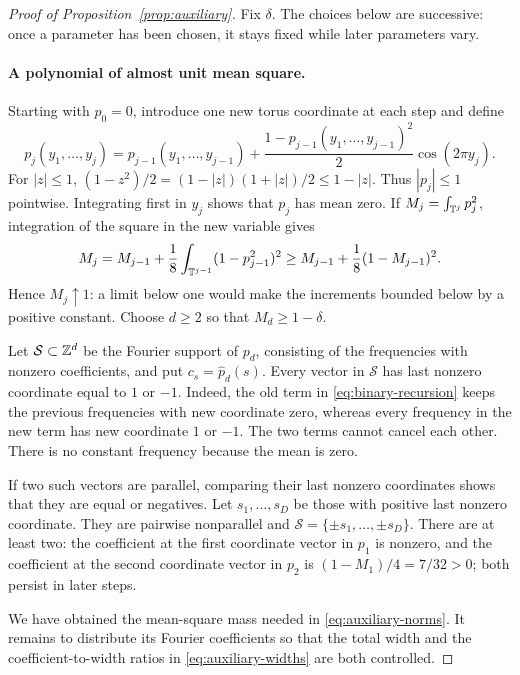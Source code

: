 \begin{proof}[Proof of Proposition~\ref{prop:auxiliary}]
Fix $\delta$.  The choices below are successive: once a parameter has
been chosen, it stays fixed while later parameters vary.

\paragraph{A polynomial of almost unit mean square.}
Starting with $p_0=0$, introduce one new torus coordinate at each step
and define
\begin{equation}
 \label{eq:binary-recursion}
 p_j(y_1,\ldots,y_j)
 =p_{j-1}(y_1,\ldots,y_{j-1})
  +\frac{1-p_{j-1}(y_1,\ldots,y_{j-1})^2}{2}\cos(2\pi y_j).
\end{equation}
For $|z|\le1$,
$(1-z^2)/2=(1-|z|)(1+|z|)/2\le1-|z|$.  Thus $|p_j|\le1$
pointwise.  Integrating first in $y_j$ shows that $p_j$ has mean zero.
If $M_j=\int_{\mathbb T^j}p_j^2$, integration of the square in the new variable
gives
\begin{equation}
 \label{eq:binary-energy}
 M_j=M_{j-1}+\frac18\int_{\mathbb T^{j-1}}(1-p_{j-1}^2)^2
 \ge M_{j-1}+\frac18(1-M_{j-1})^2.
\end{equation}
Hence $M_j\uparrow1$: a limit below one would make the increments
bounded below by a positive constant.  Choose $d\ge2$ so that
$M_d\ge1-\delta$.

Let $\mathcal S\subset\mathbb Z^d$ be the Fourier support of $p_d$, consisting
of the frequencies with nonzero coefficients, and put
$c_s=\widehat p_d(s)$.  Every vector in $\mathcal S$ has last nonzero
coordinate equal to $1$ or $-1$.  Indeed, the old term in
\eqref{eq:binary-recursion} keeps the previous frequencies with new
coordinate zero, whereas every frequency in the new term has new
coordinate $1$ or $-1$.  The two terms cannot cancel each other.
There is no constant frequency because the mean is zero.

If two such vectors are parallel, comparing their last nonzero
coordinates shows that they are equal or negatives.  Let
$s_1,\ldots,s_D$ be those with positive last nonzero coordinate.
They are pairwise nonparallel and
$\mathcal S=\{\pm s_1,\ldots,\pm s_D\}$.  There are at least two:
the coefficient at the first coordinate vector in $p_1$ is nonzero,
and the coefficient at the second coordinate vector in $p_2$ is
$(1-M_1)/4=7/32>0$; both persist in later steps.

We have obtained the mean-square mass needed in
\eqref{eq:auxiliary-norms}.  It remains to distribute its Fourier
coefficients so that the total width and the coefficient-to-width
ratios in \eqref{eq:auxiliary-widths} are both controlled.


\end{proof}
